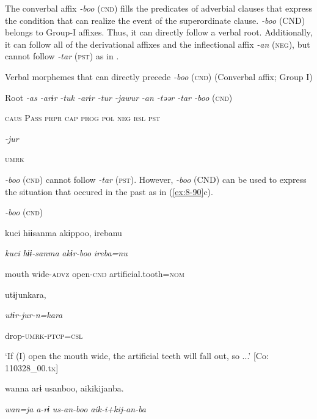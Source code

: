 The converbal affix \textit{{}-boo} (\textsc{cnd}) fills the predicates of adverbial clauses that express the condition that can realize the event of the superordinate clause. \textit{{}-boo} (CND) belongs to Group-I affixes. Thus, it can directly follow a verbal root. Additionally, it can follow all of the derivational affixes and the inflectional affix \textit{{}-an} (\textsc{neg}), but cannot follow \textit{{}-tar} (\textsc{pst}) as in .

\ea\label{ex:8-89}
  Verbal morphemes that can directly precede \textit{{}-boo} (\textsc{cnd}) (Converbal affix; Group I)

  Root  \textit{{}-as  {}-arɨr} %
\textit{{}-tuk  {}-arɨr  {}-tur  {}-jawur} %
\textit{{}-an  {}-təər  {}-tar  {}-boo} (\textsc{cnd})

    \textsc{caus}  P\textsc{ass}  \textsc{prpr}  \textsc{cap}  \textsc{prog}  \textsc{pol}  \textsc{neg}  \textsc{rsl}  \textsc{pst}

          \textit{{}-jur} 

          \textsc{umrk}

\textit{{}-boo} (\textsc{cnd}) cannot follow \textit{{}-tar} (\textsc{pst}). However, \textit{-boo} (CND) can be used to express the situation that occured in the past as in (\ref{ex:8-90}c).

\ea\label{ex:8-90}
  \textit{{}-boo} (\textsc{cnd})

\ea {\TM}
\glll  kuci  hɨɨsanma  akɨppoo,  {\textbar}ireba{\textbar}nu

      \textit{kuci}  \textit{hɨɨ-sanma}  \textit{akɨr-boo}  \textit{ireba=nu}

      mouth  wide-\textsc{advz}  open-\textsc{cnd}  artificial.tooth=\textsc{nom}

      utɨjunkara,

      \textit{utɨr-jur-n=kara}

      drop-\textsc{umrk}-\textsc{ptcp}=\textsc{csl}

\glt ‘If (I) open the mouth wide, the artificial teeth will fall out, so ...’ [Co: 110328\_00.tx]


    {\TM}
\glll  wanna  arɨ  usanboo,  aikikijanba.

      \textit{wan=ja}  \textit{a-rɨ}  \textit{us-an-boo}  \textit{aik-i+kij-an-ba}

